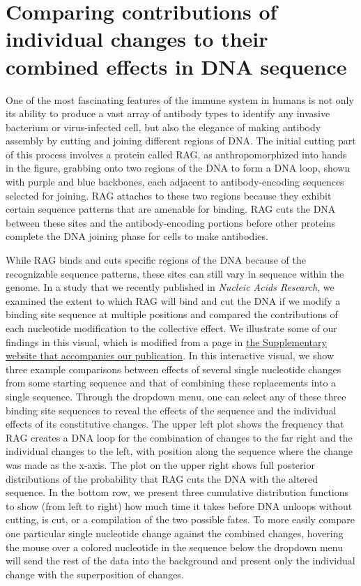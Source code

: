 \documentclass[11pt, oneside]{article}   	%
\begin{document}
\section*{Comparing contributions of individual changes to their combined effects in DNA sequence}
\author{Griffin Chure, Soichi Hirokawa}

One of the most fascinating features of the immune system in humans is not only
its ability to produce a vast array of antibody types to identify any invasive bacterium or virus-infected cell,
but also the elegance of making antibody assembly by cutting and joining different regions of DNA. 
The initial cutting part of this process involves a protein called RAG, as anthropomorphized into hands in the figure, 
grabbing onto two regions of the DNA to form a DNA loop, shown with purple and blue backbones, each adjacent to 
antibody-encoding sequences selected for joining. RAG attaches to these two regions because they exhibit certain
sequence patterns that are amenable for binding. RAG cuts the DNA between these sites and the 
antibody-encoding portions before other proteins complete the DNA joining phase for cells to make antibodies.

While RAG binds and cuts specific regions of the DNA because of the recognizable sequence patterns, 
these sites can still vary in sequence within the genome. In a study that we 
recently published in \emph{Nucleic Acids Research}, we examined the extent to which RAG will bind
and cut the DNA if we modify a binding site sequence at multiple positions and compared the contributions
of each nucleotide modification to the collective effect. We illustrate some of our findings in this visual, which is modified from a page in 
\href{https://www.rpgroup.caltech.edu/vdj_recombination}{the Supplementary website that accompanies our publication}. 
In this interactive visual, we show three example comparisons between effects of several single nucleotide changes from
some starting sequence
and that of combining these replacements into a single sequence. Through the dropdown menu, one can select
any of these three binding site sequences to reveal the effects of the sequence and the individual effects of its constitutive
changes. The upper left plot shows the frequency that RAG creates
a DNA loop for the combination of changes to the far right and the individual changes to the left, 
with position along the sequence where the change was made as the x-axis. The plot on the upper right shows full posterior
distributions of the probability that RAG cuts the DNA with the altered sequence. In the bottom row, we present three cumulative
distribution functions to show (from left to right) how much time it takes before DNA unloops without cutting, 
is cut, or a compilation of the two possible fates. To more easily compare one particular
single nucleotide change against the combined changes, hovering the mouse over a colored 
nucleotide in the sequence below the dropdown menu will send the rest of the data into the background
and present only the individual change with the superposition of changes. 
\end{document}
